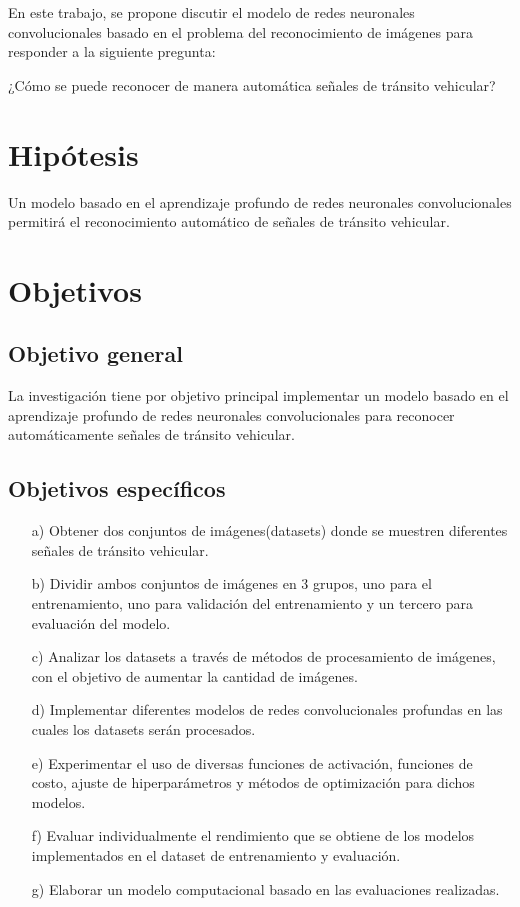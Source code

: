   En este trabajo, se propone discutir el modelo de redes neuronales convolucionales basado en el problema del reconocimiento de imágenes para responder a la siguiente pregunta:
 \begin{center} 
     ¿Cómo se puede reconocer de manera automática señales de tránsito vehicular?
 \end{center}

\section{Hipótesis}
	 Un modelo basado en el aprendizaje profundo de redes neuronales convolucionales permitirá el reconocimiento automático de señales de tránsito vehicular.



\section{Objetivos}
	\subsection{Objetivo general}
	La investigación tiene por objetivo principal implementar un modelo basado en el aprendizaje profundo de redes neuronales convolucionales para reconocer automáticamente señales de tránsito vehicular.
	
	\vskip 0.2cm
		
	\subsection{Objetivos específicos}
	\begin{enumerate}
	
	\item[a)] Obtener dos conjuntos de imágenes(datasets) donde se muestren diferentes señales de tránsito vehicular.
	\item[b)] Dividir ambos conjuntos de imágenes en 3 grupos, uno para el entrenamiento, uno para validación del entrenamiento y un tercero para evaluación del modelo. 
	\item[c)] Analizar los datasets a través de métodos de procesamiento de imágenes, con el objetivo de aumentar la cantidad de imágenes.
	\item[d)] Implementar diferentes modelos de redes convolucionales profundas en las cuales los datasets serán procesados.
	\item[e)] Experimentar el uso de diversas funciones de activación, funciones de costo, ajuste de hiperparámetros y métodos de optimización para dichos modelos. 
	\item[f)] Evaluar individualmente el rendimiento que se obtiene de los modelos implementados en el dataset de entrenamiento y evaluación.
	\item[g)] Elaborar un modelo computacional basado en las evaluaciones realizadas.
	\end{enumerate}



